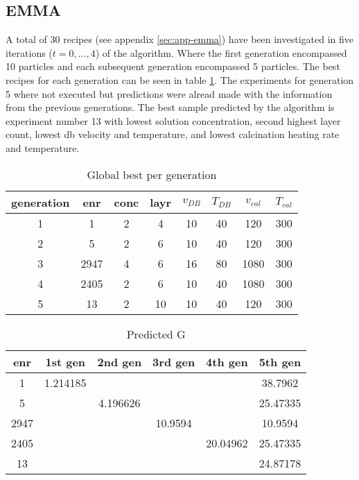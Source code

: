 \subsection{EMMA}

A total of 30 recipes (see appendix \ref{sec:app-emma}) have been investigated in 
five iterations ($t = 0, \dots, 4$) of the algorithm. 
Where the first generation encompassed 10 particles and each subsequent generation encompassed 5 particles. 
The best recipes for each generation can be seen in table \ref{tab:emma-Gb}. 
The experiments for generation 5 where not executed but 
predictions were alread made
with the information from the previous generations. 
The best sample predicted by the algorithm is experiment number 13 with 
lowest solution concentration, second highest layer count, lowest \gls{db} velocity and temperature, 
and lowest calcination heating rate and temperature. 

\begin{table}[htb]
	\centering
    \caption{Global best per generation}
	\label{tab:emma-Gb}
	\begin{tabular}{cccccccc}
        \hline\hline
        generation  &enr &conc &layr &$v_{DB}$ &$T_{DB}$ &$v_{cal}$ &$T_{cal}$\\
        \hline
     1   &1       &2    &4   &10   &40  &120  &300\\
     2   &5       &2    &6   &10   &40  &120  &300\\
     3   &2947    &4    &6   &16   &80 &1080  &300\\
     4   &2405    &2    &6   &10   &40 &1080  &300\\
     5   &13      &2   &10   &10   &40  &120  &300\\
    \hline\hline
	\end{tabular}
\end{table}

\begin{table}
	\centering
    \caption{Predicted G} 
    \label{tab:emma-pred-G}
    \begin{tabular}{cccccc}
        \hline\hline
    enr     &1st gen     &2nd gen        &3rd gen        &4th gen        &5th gen\\
        \hline
    1       &1.214185    &       &       &       &38.7962       \\
    5       &       &4.196626       &       &       &25.47335       \\
    2947    &       &       &10.9594    &       &10.9594       \\
    2405    &       &       &       &20.04962   &25.47335       \\
    13      &       &       &       &       &24.87178   \\
        \hline\hline
    \end{tabular}
\end{table}

